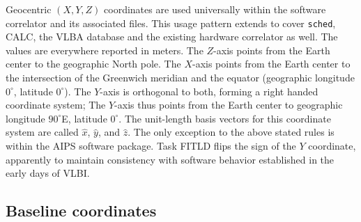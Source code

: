 Geocentric $(X,Y,Z)$ coordinates are used universally within the software correlator and its associated files.
This usage pattern extends to cover {\tt sched}, CALC, the VLBA database and the existing hardware correlator as well.
The values are everywhere reported in meters.
The $Z$-axis points from the Earth center to the geographic North pole.
The $X$-axis points from the Earth center to the intersection of the Greenwich meridian and the equator (geographic longitude $0^{\circ}$, latitude $0^{\circ}$).
The $Y$-axis is orthogonal to both, forming a right handed coordinate system; The $Y$-axis thus points from the Earth center to geographic longitude $90^{\circ}$E, latitude $0^{\circ}$.
The unit-length basis vectors for this coordinate system are called $\hat{x}$, $\hat{y}$, and $\hat{z}$.
The only exception to the above stated rules is within the AIPS software package.
Task FITLD flips the sign of the $Y$ coordinate, apparently to maintain consistency with software behavior established in the early days of VLBI.

\subsection{Baseline coordinates} \label{sec:uvwvconventions}

